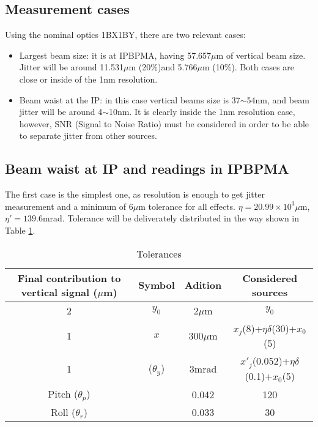 \subsection{Measurement cases}
Using the nominal optics 1BX1BY, there are two relevant cases:
\begin{itemize}
 \item Largest beam size: it is at IPBPMA, having 57.657$\mu$m of vertical beam size. Jitter will be around 11.531$\mu$m (20\%)and 5.766$\mu$m (10\%). Both cases are close or inside of the 1nm resolution.
 \item Beam waist at the IP: in this case vertical beams size is 37$\sim$54nm, and beam jitter will be around 4$\sim$10nm. It is clearly inside the 1nm resolution case, however, SNR (Signal to Noise Ratio) must be considered in order to be able to separate jitter from other sources.
\end{itemize}
\subsection{Beam waist at IP and readings in IPBPMA}
The first case is the simplest one, as resolution is enough to get jitter measurement and a minimum of 6$\mu$m tolerance for all effects. $\eta=20.99\times10^{3}\mu$m, $\eta'=139.6$mrad. Tolerance will be deliverately distributed in the way shown in Table \ref{jsources}.
\begin{table}[htb]
 \begin{center}
  \begin{tabular}{|c|c|c|c|}\hline
  Final contribution to vertical signal ($\mu$m) & Symbol & Adition &Considered sources\\\hline
   2 & $y_0$ & 2$\mu$m & $y_0$\\
   1 & $x$ & 300$\mu$m & $x_j$(8)+$\eta\delta$(30)+$x_0$(5)\\
   1 & ($\theta_y$)&3mrad&$x'_j$(0.052)+$\eta\delta$(0.1)+$x_0$(5)\\
   Pitch ($\theta_p$)&&0.042&120\\
   Roll ($\theta_r$)&&0.033&30\\\hline
  \end{tabular}\caption{Tolerances}\label{jsources}
 \end{center}
\end{table}
